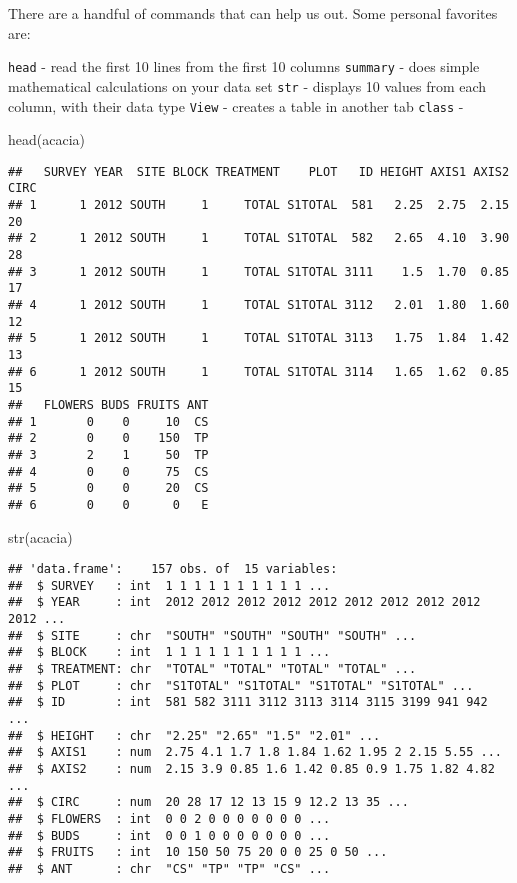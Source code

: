 \documentclass[
]{article}
\newenvironment{Shaded}{\begin{snugshade}}{\end{snugshade}}
\newcommand{\FunctionTok}[1]{\textcolor[rgb]{0.00,0.00,0.00}{#1}}
\newcommand{\NormalTok}[1]{#1}
\begin{document}
There are a handful of commands that can help us out. Some personal
favorites are:

\texttt{head} - read the first 10 lines from the first 10 columns
\texttt{summary} - does simple mathematical calculations on your data
set \texttt{str} - displays 10 values from each column, with their data
type \texttt{View} - creates a table in another tab \texttt{class} -

\begin{Shaded}
\begin{Highlighting}[]
\FunctionTok{head}\NormalTok{(acacia)}
\end{Highlighting}
\end{Shaded}

\begin{verbatim}
##   SURVEY YEAR  SITE BLOCK TREATMENT    PLOT   ID HEIGHT AXIS1 AXIS2 CIRC
## 1      1 2012 SOUTH     1     TOTAL S1TOTAL  581   2.25  2.75  2.15   20
## 2      1 2012 SOUTH     1     TOTAL S1TOTAL  582   2.65  4.10  3.90   28
## 3      1 2012 SOUTH     1     TOTAL S1TOTAL 3111    1.5  1.70  0.85   17
## 4      1 2012 SOUTH     1     TOTAL S1TOTAL 3112   2.01  1.80  1.60   12
## 5      1 2012 SOUTH     1     TOTAL S1TOTAL 3113   1.75  1.84  1.42   13
## 6      1 2012 SOUTH     1     TOTAL S1TOTAL 3114   1.65  1.62  0.85   15
##   FLOWERS BUDS FRUITS ANT
## 1       0    0     10  CS
## 2       0    0    150  TP
## 3       2    1     50  TP
## 4       0    0     75  CS
## 5       0    0     20  CS
## 6       0    0      0   E
\end{verbatim}

\begin{Shaded}
\begin{Highlighting}[]
\FunctionTok{str}\NormalTok{(acacia)}
\end{Highlighting}
\end{Shaded}

\begin{verbatim}
## 'data.frame':    157 obs. of  15 variables:
##  $ SURVEY   : int  1 1 1 1 1 1 1 1 1 1 ...
##  $ YEAR     : int  2012 2012 2012 2012 2012 2012 2012 2012 2012 2012 ...
##  $ SITE     : chr  "SOUTH" "SOUTH" "SOUTH" "SOUTH" ...
##  $ BLOCK    : int  1 1 1 1 1 1 1 1 1 1 ...
##  $ TREATMENT: chr  "TOTAL" "TOTAL" "TOTAL" "TOTAL" ...
##  $ PLOT     : chr  "S1TOTAL" "S1TOTAL" "S1TOTAL" "S1TOTAL" ...
##  $ ID       : int  581 582 3111 3112 3113 3114 3115 3199 941 942 ...
##  $ HEIGHT   : chr  "2.25" "2.65" "1.5" "2.01" ...
##  $ AXIS1    : num  2.75 4.1 1.7 1.8 1.84 1.62 1.95 2 2.15 5.55 ...
##  $ AXIS2    : num  2.15 3.9 0.85 1.6 1.42 0.85 0.9 1.75 1.82 4.82 ...
##  $ CIRC     : num  20 28 17 12 13 15 9 12.2 13 35 ...
##  $ FLOWERS  : int  0 0 2 0 0 0 0 0 0 0 ...
##  $ BUDS     : int  0 0 1 0 0 0 0 0 0 0 ...
##  $ FRUITS   : int  10 150 50 75 20 0 0 25 0 50 ...
##  $ ANT      : chr  "CS" "TP" "TP" "CS" ...
\end{verbatim}
\end{document}
